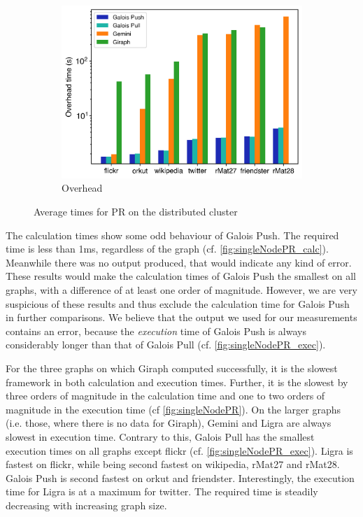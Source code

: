 \begin{figure}[h]
\begin{subfigure}{0.32\textwidth}
		\includegraphics[width=\linewidth]{../../plots/distributedPR_overheadTime.png}
		\caption{Overhead}
		\label{fig:distributedPR_overhead}
	\end{subfigure}
	\hfil
	\caption{Average times for PR on the distributed cluster}
	\label{fig:distributedPR}
\end{figure}

The calculation times show some odd behaviour of Galois Push. The required time is less than 1ms, regardless of the graph (cf. \autoref{fig:singleNodePR_calc}). Meanwhile there was no output produced, that would indicate any kind of error. These results would make the calculation times of Galois Push the smallest on all graphs, with a difference of at least one order of magnitude. However, we are very suspicious of these results and thus exclude the calculation time for Galois Push in further comparisons. 
We believe that the output we used for our measurements contains an error,
because the \emph{execution} time of Galois Push is always considerably longer than that of Galois Pull (cf. \autoref{fig:singleNodePR_exec}).

For the three graphs on which Giraph computed successfully, it is the slowest framework in both calculation and execution times. Further, it is the slowest by three orders of magnitude in the calculation time and one to two orders of magnitude in the execution time (cf \autoref{fig:singleNodePR}). On the larger graphs (i.e. those, where there is no data for Giraph), Gemini and Ligra are always slowest in execution time.
Contrary to this, Galois Pull has the smallest execution times on all graphs except flickr (cf. \autoref{fig:singleNodePR_exec}). Ligra is fastest on flickr, while being second fastest on wikipedia, rMat27 and rMat28. Galois Push is second fastest on orkut and friendster.
Interestingly, the execution time for Ligra is at a maximum for twitter. The required time is steadily decreasing with increasing graph size.


